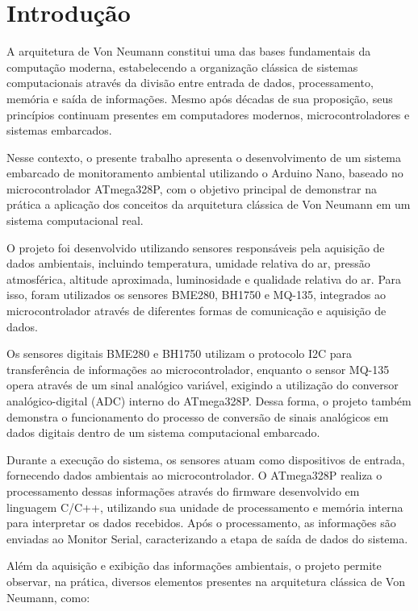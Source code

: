 \documentclass[a4paper,12pt]{article}
\begin{document}
\tableofcontents
\newpage

\section{Introdução}
A arquitetura de Von Neumann constitui uma das bases fundamentais da computação moderna, estabelecendo a organização clássica de sistemas computacionais através da divisão entre entrada de dados, processamento, memória e saída de informações. Mesmo após décadas de sua proposição, seus princípios continuam presentes em computadores modernos, microcontroladores e sistemas embarcados.

Nesse contexto, o presente trabalho apresenta o desenvolvimento de um sistema embarcado de monitoramento ambiental utilizando o Arduino Nano, baseado no microcontrolador ATmega328P, com o objetivo principal de demonstrar na prática a aplicação dos conceitos da arquitetura clássica de Von Neumann em um sistema computacional real.

O projeto foi desenvolvido utilizando sensores responsáveis pela aquisição de dados ambientais, incluindo temperatura, umidade relativa do ar, pressão atmosférica, altitude aproximada, luminosidade e qualidade relativa do ar. Para isso, foram utilizados os sensores BME280, BH1750 e MQ-135, integrados ao microcontrolador através de diferentes formas de comunicação e aquisição de dados.

Os sensores digitais BME280 e BH1750 utilizam o protocolo I2C para transferência de informações ao microcontrolador, enquanto o sensor MQ-135 opera através de um sinal analógico variável, exigindo a utilização do conversor analógico-digital (ADC) interno do ATmega328P. Dessa forma, o projeto também demonstra o funcionamento do processo de conversão de sinais analógicos em dados digitais dentro de um sistema computacional embarcado.

Durante a execução do sistema, os sensores atuam como dispositivos de entrada, fornecendo dados ambientais ao microcontrolador. O ATmega328P realiza o processamento dessas informações através do firmware desenvolvido em linguagem C/C++, utilizando sua unidade de processamento e memória interna para interpretar os dados recebidos. Após o processamento, as informações são enviadas ao Monitor Serial, caracterizando a etapa de saída de dados do sistema.

Além da aquisição e exibição das informações ambientais, o projeto permite observar, na prática, diversos elementos presentes na arquitetura clássica de Von Neumann, como:
\end{document}
